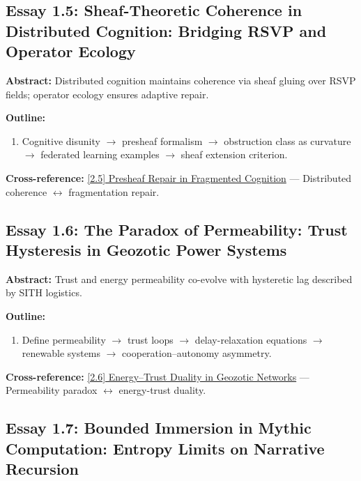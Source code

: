 \documentclass[12pt,a4paper]{article}
\begin{document}
\subsection{Essay 1.5: Sheaf-Theoretic Coherence in Distributed Cognition: Bridging RSVP and Operator Ecology}
\label{sec:essay1-5}

\textbf{Abstract:} Distributed cognition maintains coherence via sheaf gluing over RSVP fields; operator ecology ensures adaptive repair.

\textbf{Outline:}
\begin{enumerate}
\item Cognitive disunity $\to$ presheaf formalism $\to$ obstruction class as curvature $\to$ federated learning examples $\to$ sheaf extension criterion.
\end{enumerate}

\textbf{Cross-reference:} \hyperref[sec:essay2-5]{[2.5] Presheaf Repair in Fragmented Cognition} --- Distributed coherence $\leftrightarrow$ fragmentation repair.

\subsection{Essay 1.6: The Paradox of Permeability: Trust Hysteresis in Geozotic Power Systems}
\label{sec:essay1-6}

\textbf{Abstract:} Trust and energy permeability co-evolve with hysteretic lag described by SITH logistics.

\textbf{Outline:}
\begin{enumerate}
\item Define permeability $\to$ trust loops  $\to$ delay-relaxation equations $\to$ renewable systems $\to$ cooperation--autonomy asymmetry.
\end{enumerate}

\textbf{Cross-reference:} \hyperref[sec:essay2-6]{[2.6] Energy--Trust Duality in Geozotic Networks} --- Permeability paradox $\leftrightarrow$ energy-trust duality.

\subsection{Essay 1.7: Bounded Immersion in Mythic Computation: Entropy Limits on Narrative Recursion}
\label{sec:essay1-7}
\end{document}
